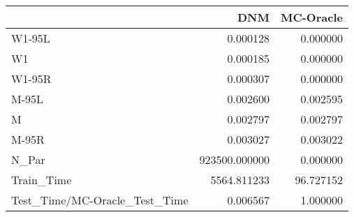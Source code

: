 \begin{tabular}{lrr}
\toprule
{} &            DNM &  MC-Oracle \\
\midrule
W1-95L                        &       0.000128 &   0.000000 \\
W1                            &       0.000185 &   0.000000 \\
W1-95R                        &       0.000307 &   0.000000 \\
M-95L                         &       0.002600 &   0.002595 \\
M                             &       0.002797 &   0.002797 \\
M-95R                         &       0.003027 &   0.003022 \\
N\_Par                         &  923500.000000 &   0.000000 \\
Train\_Time                    &    5564.811233 &  96.727152 \\
Test\_Time/MC-Oracle\_Test\_Time &       0.006567 &   1.000000 \\
\bottomrule
\end{tabular}
